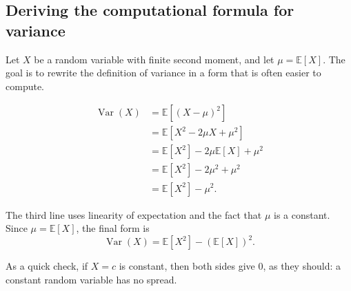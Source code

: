 
\subsection{Deriving the computational formula for variance}

Let \(X\) be a random variable with finite second moment, and let
\(\mu = \mathbb{E}[X]\). The goal is to rewrite the definition of variance
in a form that is often easier to compute.

\begin{align}
  \operatorname{Var}(X)
    &= \mathbb{E}\left[(X-\mu)^2\right] \\
    &= \mathbb{E}\left[X^2 - 2\mu X + \mu^2\right] \\
    &= \mathbb{E}[X^2] - 2\mu \mathbb{E}[X] + \mu^2 \\
    &= \mathbb{E}[X^2] - 2\mu^2 + \mu^2 \\
    &= \mathbb{E}[X^2] - \mu^2.
\end{align}

The third line uses linearity of expectation and the fact that \(\mu\) is a
constant. Since \(\mu=\mathbb{E}[X]\), the final form is
\[
  \boxed{\operatorname{Var}(X)=\mathbb{E}[X^2]-(\mathbb{E}[X])^2.}
\]

As a quick check, if \(X=c\) is constant, then both sides give \(0\), as they
should: a constant random variable has no spread.

